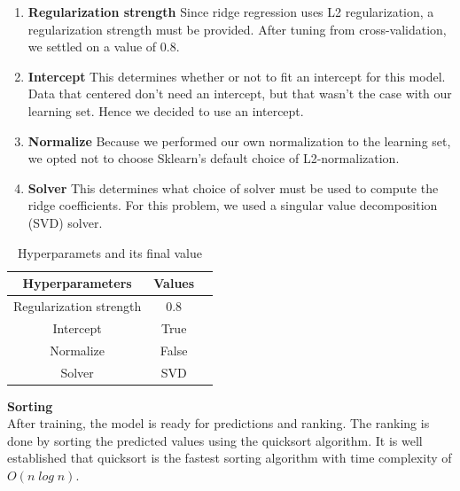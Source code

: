 \begin{enumerate}


    \item \textbf{Regularization strength}
Since ridge regression uses L2 regularization, a regularization strength must be provided. After tuning from cross-validation, we settled on a value of 0.8.

    \item \textbf{Intercept}
This determines whether or not to fit an intercept for this model. Data that centered don't need an intercept, but that wasn't the case with our learning set. Hence we decided to use an intercept.

    \item \textbf{Normalize}
Because we performed our own normalization to the learning set, we opted not to choose Sklearn's default choice of L2-normalization.
    
    \item \textbf{Solver}
This determines what choice of solver must be used to compute the ridge coefficients. For this problem, we used a singular value decomposition (SVD) solver.
    
\end{enumerate}



\begin{table}
\centering
\caption{Hyperparamets and its final value}
\label{Hyperparamets and its final value}
\begin{tabular}{|c|c|c|}    \hline  

Hyperparameters                                 & Values\\ \hline\hline
Regularization strength                         & 0.8 \\ \hline
Intercept                         & True  \\ \hline
Normalize                    & False  \\ \hline
Solver                      & SVD \\ \hline

\end{tabular}
\end{table}

\textbf{Sorting}\\
After training, the model is ready for predictions and ranking. The ranking is done by sorting the predicted values using the quicksort algorithm. It is well established that quicksort is the fastest sorting algorithm with time complexity of $O(n\;log\;n)$.


